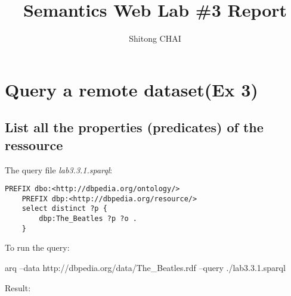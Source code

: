 \documentclass[a4paper, 12pt]{report}
\title{Semantics Web Lab \#3 Report}
\date{}
\author{Shitong CHAI}
\begin{document}
\maketitle
\tableofcontents

\chapter{Query a remote dataset(Ex 3)}
\section{List all the properties (predicates) of the ressource}
The query file \emph{lab3.3.1.sparql}:
\begin{lstlisting}[frame=single]
    PREFIX dbo:<http://dbpedia.org/ontology/>
    PREFIX dbp:<http://dbpedia.org/resource/>
    select distinct ?p {
        dbp:The_Beatles ?p ?o .
    }
\end{lstlisting}
To run the query:
\begin{commandshell}
    arq --data http://dbpedia.org/data/The_Beatles.rdf --query ./lab3.3.1.sparql
\end{commandshell}
Result:
\end{document}
